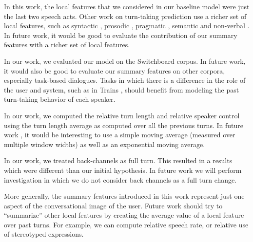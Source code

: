 In this work, the local features that we considered in our baseline model were just the last two speech acts.  Other work on turn-taking prediction use a richer set of local features, such as
%
syntactic \cite{ duncan1972some, sacks1974simplest, ford1996interactional, de2006projecting, magyari2012prediction, atterer2008towards}, prosodic \cite{ duncan1972some, ford1996interactional, shriberg2000prosody, ferrer2003prosody, de2006projecting, reed2009units, raux2012optimizing, hariharan2001robust, atterer2008towards}, pragmatic \cite{ ford1996interactional, garrod2015use, raux2012optimizing}, semantic \cite{raux2012optimizing} and non-verbal \cite{kendon1967some}. In future work, it would be good to evaluate the contribution of our summary features with a richer set of local features.

In our work, we evaluated our model on the Switchboard corpus.  In future work, it would also be good to evaluate our summary features on other corpora, especially task-based dialogues.  Tasks in which there is a difference in the role of the user and system, such as in Trains \cite{HeemanAllen95:cdrom}, should benefit from modeling the past turn-taking behavior of each speaker.

In our work, we computed the relative turn length and relative speaker control using the turn length average as computed over all the previous turns. In future work , it would be interesting to use a simple moving average (measured over multiple window widths) as well as an exponential moving average.

In our work, we treated back-channels as full turn. This resulted in a results which were different than our initial hypothesis. In future work we will perform investigation in which we do not consider back channels as a full turn change.

More generally, the summary features introduced in this work represent just one aspect of the conversational image of the user. Future work should try to ``summarize'' other local features by creating
the average value of a local feature over past turns. For example, we can compute relative speech rate, or relative use of stereotyped expressions.
